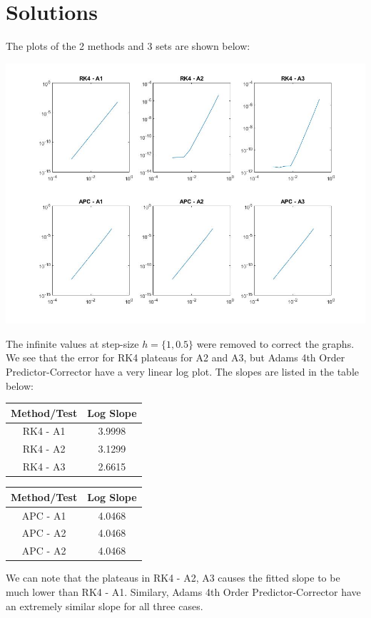 \documentclass[12pt]{article}
\begin{document}
\section{Solutions}
The plots of the 2 methods and 3 sets are shown below:
\begin{center}
\includegraphics[scale=.6]{Plots}
\end{center}
The infinite values at step-size $h = \{1, 0.5\}$ were removed to correct the graphs. We see that the error for RK4 plateaus for A2 and A3, but Adams 4th Order Predictor-Corrector have a very linear log plot. The slopes are listed in the table below:
\begin{multicols}{2}
\begin{center}
\begin{tabular}{|c|c|}
\hline
Method/Test & Log Slope \\
\hline
RK4 - A1 & 3.9998 \\
\hline
RK4 - A2 & 3.1299 \\
\hline
RK4 - A3 & 2.6615 \\
\hline
\end{tabular}
\end{center}
\columnbreak
\begin{center}
\begin{tabular}{|c|c|}
\hline
Method/Test & Log Slope \\
\hline
APC - A1 & 4.0468 \\
\hline
APC - A2 & 4.0468 \\
\hline
APC - A2 & 4.0468 \\
\hline
\end{tabular}
\end{center}
\end{multicols}
We can note that the plateaus in RK4 - A2, A3 causes the fitted slope to be much lower than RK4 - A1. Similary, Adams 4th Order Predictor-Corrector have an extremely similar slope for all three cases.
\end{document}
